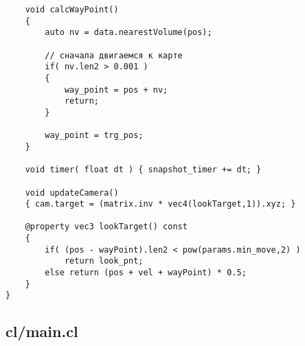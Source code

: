 \begin{verbatim}
    void calcWayPoint()
    {
        auto nv = data.nearestVolume(pos);

        // сначала двигаемся к карте
        if( nv.len2 > 0.001 )
        {
            way_point = pos + nv;
            return;
        }

        way_point = trg_pos;
    }

    void timer( float dt ) { snapshot_timer += dt; }

    void updateCamera()
    { cam.target = (matrix.inv * vec4(lookTarget,1)).xyz; }

    @property vec3 lookTarget() const
    {
        if( (pos - wayPoint).len2 < pow(params.min_move,2) )
            return look_pnt;
        else return (pos + vel + wayPoint) * 0.5;
    }
}
\end{verbatim}

\subsection{cl/main.cl}

